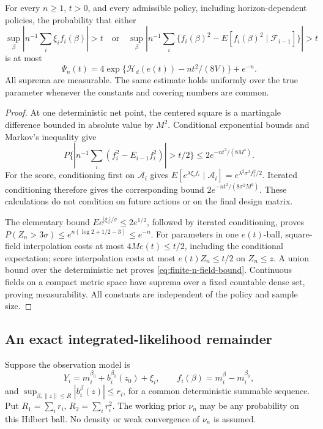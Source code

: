 \begin{proposition}
\label{prop:finite-n-field-concentration}
For every \(n\ge1\), \(t>0\), and every admissible policy, including
horizon-dependent policies, the probability that either
\[
 \sup_\beta\left|n^{-1}\sum_i\xi_if_i(\beta)\right|>t
 \quad\text{or}\quad
 \sup_\beta\left|n^{-1}\sum_i\{f_i(\beta)^2-
 E[f_i(\beta)^2\mid\mathcal F_{i-1}]\}\right|>t
\]
is at most
\begin{equation}
 \Psi_n(t)=4\exp\{\mathcal H_d(e(t))-nt^2/(8V)\}+e^{-n}.
 \label{eq:finite-n-field-bound}
\end{equation}
All suprema are measurable. The same estimate holds uniformly over the
true parameter whenever the constants and covering numbers are common.
\end{proposition}
\begin{proof}
At one deterministic net point, the centered square is a martingale
difference bounded in absolute value by \(M^2\). Conditional exponential
bounds and Markov's inequality give
\[
 P\{|n^{-1}\sum_i(f_i^2-E_{i-1}f_i^2)|>t/2\}
 \le2e^{-nt^2/(8M^4)}.
\]
For the score, conditioning first on \(\mathcal A_i\) gives
\(E[e^{\lambda\xi_if_i}\mid\mathcal A_i]
 =e^{\lambda^2\sigma^2f_i^2/2}\).
Iterated conditioning therefore gives the corresponding bound
\(2e^{-nt^2/(8\sigma^2M^2)}\). These calculations do not condition on
future actions or on the final design matrix.

The elementary bound \(E e^{|\xi_i|/\sigma}\le2e^{1/2}\), followed by
iterated conditioning, proves
\(P(Z_n>3\sigma)\le e^{n(\log2+1/2-3)}\le e^{-n}\).
For parameters in one \(e(t)\)-ball, square-field interpolation costs
at most \(4Me(t)\le t/2\), including the conditional expectation;
score interpolation costs at most \(e(t)Z_n\le t/2\) on \(Z_n\le z\).
A union bound over the deterministic net proves \eqref{eq:finite-n-field-bound}.
Continuous fields on a compact metric space have suprema over a fixed
countable dense set, proving measurability. All constants are independent
of the policy and sample size.
\end{proof}

\subsection{An exact integrated-likelihood remainder}
Suppose the observation model is
\[
 Y_i=m_i^{\beta_0}+b_i^{\beta_0}(z_0)+\xi_i,
 \qquad f_i(\beta)=m_i^\beta-m_i^{\beta_0},
\]
and \(\sup_{\beta,\|z\|\le R}|b_i^\beta(z)|\le r_i\), for a common
deterministic summable sequence. Put
\(R_1=\sum_i r_i\), \(R_2=\sum_i r_i^2\).
The working prior \(\nu_n\) may be any probability on this Hilbert ball.
No density or weak convergence of \(\nu_n\) is assumed.

